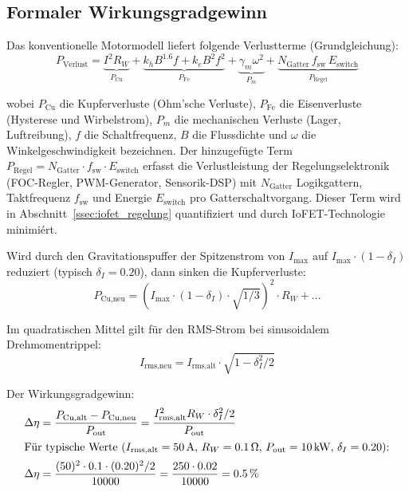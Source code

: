 ﻿\documentclass[12pt, a4paper]{report}
\theoremstyle{definition}
\theoremstyle{remark}
\begin{document}
\subsection{Formaler Wirkungsgradgewinn}

Das konventionelle Motormodell liefert folgende Verlustterme (Grundgleichung):
\begin{equation}
  P_{\text{Verlust}} = \underbrace{I^2 R_W}_{P_{\text{Cu}}}
                     + \underbrace{k_h B^{1.6} f + k_e B^2 f^2}_{P_{\text{Fe}}}
                     + \underbrace{\gamma_m \omega^2}_{P_m}
                     + \underbrace{N_\text{Gatter}\,f_\text{sw}\,E_\text{switch}}_{P_{\text{Regel}}}
  \label{eq:verluste_ges}
\end{equation}

wobei $P_{\text{Cu}}$ die Kupferverluste (Ohm'sche Verluste), $P_{\text{Fe}}$
die Eisenverluste (Hysterese und Wirbelstrom), $P_m$ die mechanischen Verluste
(Lager, Luftreibung), $f$ die Schaltfrequenz, $B$ die Flussdichte und $\omega$ die
Winkelgeschwindigkeit bezeichnen. Der hinzugefügte Term
$P_{\text{Regel}} = N_\text{Gatter} \cdot f_\text{sw} \cdot E_\text{switch}$
erfasst die Verlustleistung der Regelungselektronik (FOC-Regler, PWM-Generator,
Sensorik-DSP) mit $N_\text{Gatter}$ Logikgattern, Taktfrequenz $f_\text{sw}$
und Energie $E_\text{switch}$ pro Gatterschaltvorgang. Dieser Term wird in
Abschnitt~\ref{ssec:iofet_regelung} quantifiziert und durch IoFET-Technologie
minimiért.

Wird durch den Gravitationspuffer der Spitzenstrom von $I_{\max}$ auf
$I_{\max} \cdot (1 - \delta_I)$ reduziert (typisch $\delta_I = 0.20$), dann sinken
die Kupferverluste:
\begin{equation}
  P_{\text{Cu,neu}} = (I_{\max}\cdot(1-\delta_I)\cdot\sqrt{1/3})^2 \cdot R_W + \ldots
\end{equation}

Im quadratischen Mittel gilt für den RMS-Strom bei sinusoidalem Drehmomentrippel:
\begin{equation}
  I_{\text{rms,neu}} = I_{\text{rms,alt}} \cdot \sqrt{1 - \delta_I^2/2}
  \label{eq:I_rms_neu}
\end{equation}

Der Wirkungsgradgewinn:
\begin{align}
  \Delta\eta &= \frac{P_{\text{Cu,alt}} - P_{\text{Cu,neu}}}{P_{\text{out}}}
  = \frac{I_{\text{rms,alt}}^2 R_W \cdot \delta_I^2/2}{P_{\text{out}}}
  \label{eq:delta_eta} \\
  \intertext{Für typische Werte ($I_{\text{rms,alt}} = \SI{50}{\ampere}$,
  $R_W = \SI{0.1}{\ohm}$, $P_{\text{out}} = \SI{10}{\kilo\watt}$,
  $\delta_I = 0.20$):}
  \Delta\eta &= \frac{(50)^2 \cdot 0.1 \cdot (0.20)^2/2}{10000}
  = \frac{250 \cdot 0.02}{10000} = 0.5\,\%
  \label{eq:delta_eta_num}
\end{align}
\end{document}
